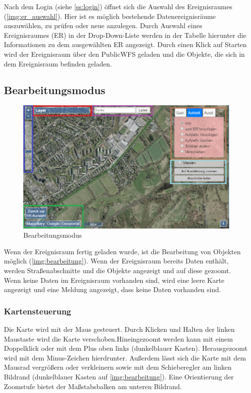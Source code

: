 \documentclass[a4paper,11pt,bibliography=totoc, listof=totoc,titlepage]{scrartcl}
\begin{document}
Nach dem Login (siehe \autoref{ss:login}) öffnet sich die Auswahl des Ereignisraumes (\autoref{img:er_auswahl}). Hier ist es möglich bestehende Datenereignisräume auszuwählen, zu prüfen oder neue anzulegen. Durch Auswahl eines Ereignisraumes (ER) in der Drop-Down-Liste werden in der Tabelle hierunter die Informationen zu dem ausgewählten ER angezeigt. Durch einen Klick auf Starten wird der Ereignisraum über den PublicWFS geladen und die Objekte, die sich in dem Ereignisraum befinden geladen.



\subsection{Bearbeitungsmodus}
\begin{figure}
 \centering
 \includegraphics[width=.9\textwidth]{./img/bearbeitung.png}
 \caption{Bearbeitungsmodus}
 \label{img:bearbeitung}
\end{figure}
Wenn der Ereignisraum fertig geladen wurde, ist die Bearbeitung von Objekten möglich (\autoref{img:bearbeitung}). Wenn der Ereignisraum bereits Daten enthält, werden Straßenabschnitte und die Objekte angezeigt und auf diese gezoomt. Wenn keine Daten im Ereignisraum vorhanden sind, wird eine leere Karte angezeigt und eine Meldung angezeigt, dass keine Daten vorhanden sind.



\subsubsection{Kartensteuerung}
Die Karte wird mit der Maus gesteuert. Durch Klicken und Halten der linken Maustaste wird die Karte verschoben.Hineingezoomt werden kann mit einem Doppelklick oder mit dem Plus oben links (dunkelblauer Kasten). Herausgezoomt wird mit dem Minus-Zeichen hierdrunter. Außerdem lässt sich die Karte mit dem Mausrad vergrößern oder verkleinern sowie mit dem Schieberegler am linken Bildrand (dunkelblauer Kasten auf \autoref{img:bearbeitung}). Eine Orientierung der Zoomstufe bietet der Maßstabsbalken am unteren Bildrand.
\end{document}
